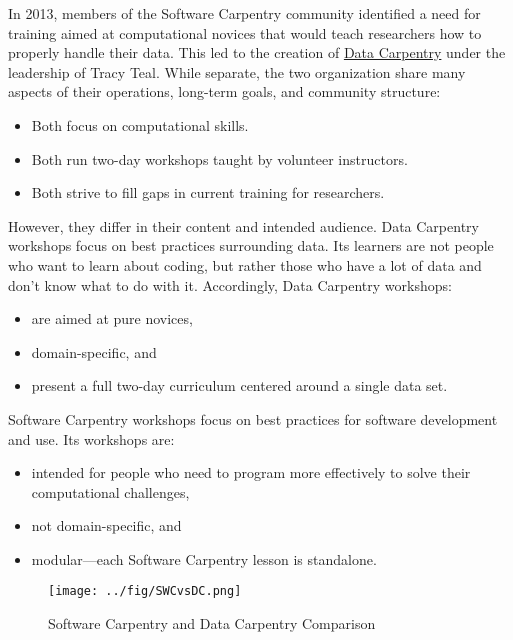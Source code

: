 In 2013, members of the Software Carpentry community identified a need
for training aimed at computational novices that would teach researchers
how to properly handle their data. This led to the creation of
\href{\{\{\%20site.dc\_site\%20\}\}}{Data Carpentry} under the leadership
of Tracy Teal. While separate, the two organization share many aspects
of their operations, long-term goals, and community structure:

\begin{itemize}
\itemsep1pt\parskip0pt
\item
  Both focus on computational skills.
\item
  Both run two-day workshops taught by volunteer instructors.
\item
  Both strive to fill gaps in current training for researchers.
\end{itemize}

However, they differ in their content and intended audience. Data
Carpentry workshops focus on best practices surrounding data. Its
learners are not people who want to learn about coding, but rather those
who have a lot of data and don't know what to do with it. Accordingly,
Data Carpentry workshops:

\begin{itemize}
\itemsep1pt\parskip0pt
\item
  are aimed at pure novices,
\item
  domain-specific, and
\item
  present a full two-day curriculum centered around a single data set.
\end{itemize}

Software Carpentry workshops focus on best practices for software
development and use. Its workshops are:

\begin{itemize}
\itemsep1pt\parskip0pt
\item
  intended for people who need to program more effectively to solve
  their computational challenges,
\item
  not domain-specific, and
\item
  modular---each Software Carpentry lesson is standalone.
\end{itemize}

\begin{figure}[htbp]
\centering
\texttt{[image: ../fig/SWCvsDC.png]}
\caption{Software Carpentry and Data Carpentry Comparison}
\end{figure}

